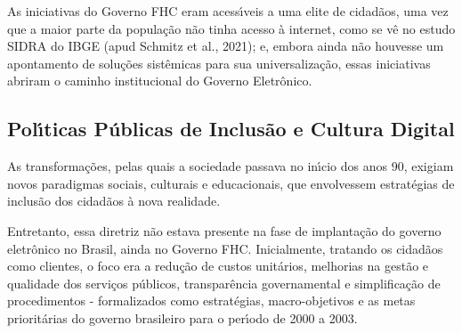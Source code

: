 \documentclass[
12pt,		%
openright,	%
twoside,  %
a4paper,			%
chapter=TITLE,		%
english,			%
french,				%
spanish,			%
brazil				%
]{USPSC-classe/USPSC}
\begin{document}
As iniciativas do Governo FHC eram  acess\'{\i}veis a uma elite de cidad\~aos, uma vez que a maior parte da popula\c{c}\~ao n\~ao tinha acesso \`a internet, como se v\^e no estudo SIDRA do IBGE (apud Schmitz et al., 2021); e, embora ainda n\~ao houvesse um apontamento de solu\c{c}\~oes sist\^emicas para sua universaliza\c{c}\~ao, essas iniciativas abriram o caminho institucional do Governo Eletr\^onico.

















\subsection[Pol\'{\i}ticas P\'ublicas de Inclus\~ao e Cultura Digital]{Pol\'{\i}ticas P\'ublicas de Inclus\~ao e Cultura Digital}\label{Pol\'{\i}ticas P\'ublicas de Inclus\~ao e Cultura Digital}
As transforma\c{c}\~oes, pelas quais a sociedade passava no in\'{\i}cio dos anos 90, exigiam novos paradigmas sociais, culturais e educacionais, que envolvessem estrat\'egias de inclus\~ao dos  cidad\~aos \`a nova realidade.

















Entretanto, essa diretriz n\~ao estava presente na fase de implanta\c{c}\~ao do governo eletr\^onico no Brasil, ainda no Governo FHC. Inicialmente, tratando os cidad\~aos como clientes, o foco era a redu\c{c}\~ao de custos unit\'arios, melhorias na gest\~ao e qualidade dos servi\c{c}os p\'ublicos, transpar\^encia governamental e simplifica\c{c}\~ao de procedimentos - formalizados como estrat\'egias, macro-objetivos e  as metas priorit\'arias  do governo brasileiro para o per\'{\i}odo de 2000 a 2003.
\end{document}
